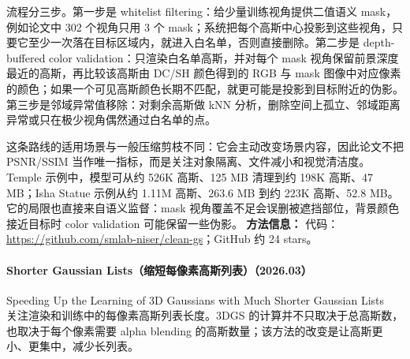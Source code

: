 流程分三步。第一步是 whitelist filtering：给少量训练视角提供二值语义 mask，例如论文中 302 个视角只用 3 个 mask；系统把每个高斯中心投影到这些视角，只要它至少一次落在目标区域内，就进入白名单，否则直接删除。第二步是 depth-buffered color validation：只渲染白名单高斯，并对每个 mask 视角保留前景深度最近的高斯，再比较该高斯由 DC/SH 颜色得到的 RGB 与 mask 图像中对应像素的颜色；如果一个可见高斯颜色长期不匹配，就更可能是投影到目标附近的伪影。第三步是邻域异常值移除：对剩余高斯做 kNN 分析，删除空间上孤立、邻域距离异常或只在极少视角偶然通过白名单的点。

这条路线的适用场景与一般压缩剪枝不同：它会主动改变场景内容，因此论文不把 PSNR/SSIM 当作唯一指标，而是关注对象隔离、文件减小和视觉清洁度。Temple 示例中，模型可从约 526K 高斯、125 MB 清理到约 198K 高斯、47 MB；Isha Statue 示例从约 1.11M 高斯、263.6 MB 到约 223K 高斯、52.8 MB。它的局限也直接来自语义监督：mask 视角覆盖不足会误删被遮挡部位，背景颜色接近目标时 color validation 可能保留一些伪影。
\textbf{方法信息：} 代码：\url{https://github.com/smlab-niser/clean-gs}；GitHub 约 24 stars。



\paragraph{Shorter Gaussian Lists（缩短每像素高斯列表）（2026.03）}
Speeding Up the Learning of 3D Gaussians with Much Shorter Gaussian Lists~\cite{2603_09277} 关注渲染和训练中的每像素高斯列表长度。3DGS 的计算并不只取决于总高斯数，也取决于每个像素需要 alpha blending 的高斯数量；该方法的改变是让高斯更小、更集中，减少长列表。

